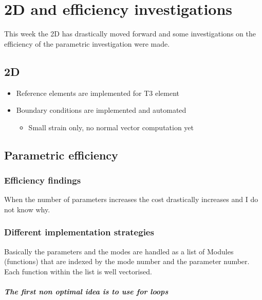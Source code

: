 \chapter[The 15$^{\text{th}}$ of March 2024]{2D and efficiency investigations}
\begin{chapabstract}
    This week the 2D has drastically moved forward and some investigations on the efficiency of the parametric investigation were made.
\end{chapabstract}

\minitoc

\section{2D}

\begin{itemize}
    \item Reference elements are implemented for T3 element
    \item Boundary conditions are implemented and automated
    \begin{itemize}
        \item Small strain only, no normal vector computation yet
    \end{itemize}
\end{itemize}



\section{Parametric efficiency}

\subsection{Efficiency findings}
When the number of parameters increases the cost drastically increases and I do not know why. 


\subsection{Different implementation strategies}
Basically the parameters and the modes are handled as a list of Modules (functions) that are indexed by the mode number and the parameter number. Each function within the list is well vectorised.


\paragraph{The first non optimal idea is to use for loops}


